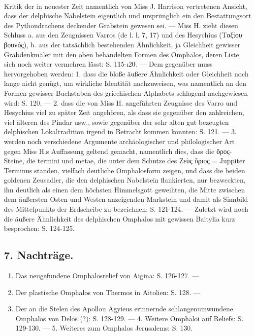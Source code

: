 \documentclass[a4paper, 11pt, oneside]{article}
\begin{document}
\paragraph{}
Kritik der in neuester Zeit namentlich von Miss J. Harrison vertretenen Ansicht, dass der delphische Nabelstein eigentlich und ursprünglich ein den Bestattungsort des Pythondrachens deckender Grabstein gewesen sei. --- Miss H. zieht diesen Schluss a. aus den Zeugnissen Varros (de l. l. 7, 17) und des Hesychius (Τοξίου βουνός), b. aus der tatsächlich bestehenden Ähnlichkeit, ja Gleichheit gewisser Grabdenkmäler mit den oben behandelten Formen des Omphalos, deren Liste sich noch weiter vermehren lässt: S. 115-ı20. --- Dem gegenüber muss hervorgehoben werden: 1. dass die bloße äußere Ähnlichkeit oder Gleichheit noch lange nicht genügt, um wirkliche Identität nachzuweisen, was namentlich an den Formen gewisser Buchstaben des griechischen Alphabets schlagend nachgewiesen wird: S. 120. --- 2. dass die von Miss H. angeführten Zeugnisse des Varro und Hesychius viel zu später Zeit angehören, als dass sie gegenüber den zahlreichen, viel älteren des Pindar usw., sowie gegenüber der sehr alten gut bezeugten delphischen Lokaltradition irgend in Betracht kommen könnten: S. 121. --- 3. werden noch verschiedene Argumente archäologischer und philologischer Art gegen Miss H.s Auffassung geltend gemacht, namentlich dies, dass die ὅρος-Steine, die termini und metae, die unter dem Schutze des Ζεὺς ὅριος = Juppiter Terminus standen, vielfach deutliche Omphalosform zeigen, und dass die beiden goldenen Zeusadler, die den delphischen Nabelstein flankierten, nur bezweckten, ihn deutlich als einen dem höchsten Himmelsgott geweihten, die Mitte zwischen dem äußersten Osten und Westen anzeigenden Markstein und damit als Sinnbild des Mittelpunkts der Erdscheibe zu bezeichnen: S. 121-124. --- Zuletzt wird noch die äußere Ähnlichkeit des delphischen Omphalos mit gewissen Baitylia kurz besprochen: S. 124-125.

\subsection*{7. Nachträge.}
\begin{enumerate}
    \item Das neugefundene Omphalosrelief von Aigina: S. 126-127. ---
    \item Der plastische Omphalos von Thermos in Aitolien: S. 128. ---
    \item Der an die Stelen des Apollon Agyieus erinnernde schlangenumwundene Omphalos von Delos (?): S. 128-129. --- 4. Weitere Omphaloi auf Reliefs: S. 129-130. --- 5. Weiteres zum Omphalos Jerusalems: S. 130.
\end{enumerate}
\end{document}
